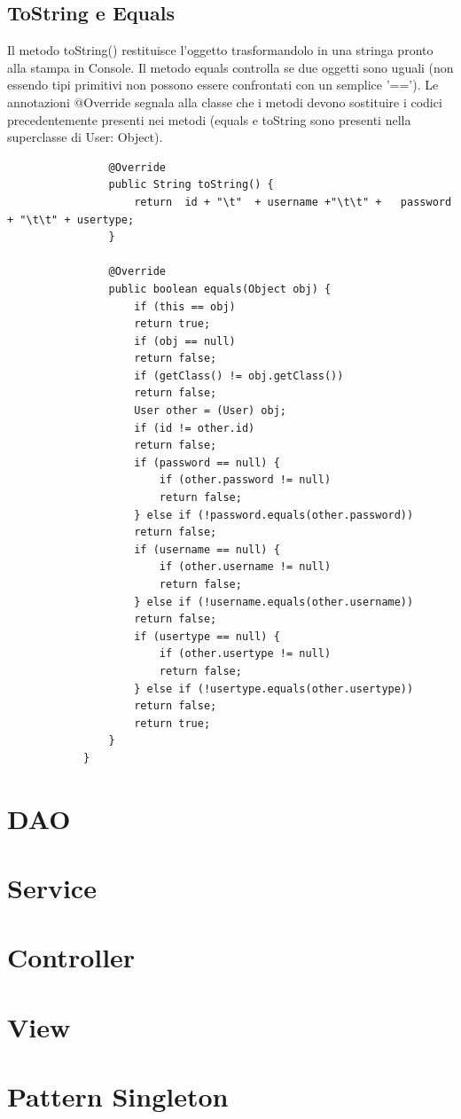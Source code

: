\documentclass[a4paper,12 pt]{article}
\begin{document}
				\subsection{ToString e Equals}
				
				Il metodo toString() restituisce l'oggetto trasformandolo in una stringa pronto alla stampa in Console. Il metodo equals controlla se due oggetti sono uguali (non essendo tipi primitivi non possono essere confrontati con un semplice '=='). Le annotazioni @Override segnala alla classe che i metodi devono sostituire i codici precedentemente presenti nei metodi (equals e toString sono presenti nella superclasse di User: Object).
				\begin{lstlisting}
				@Override
				public String toString() {
					return  id + "\t"  + username +"\t\t" +   password + "\t\t" + usertype;
				}
				
				@Override
				public boolean equals(Object obj) {
					if (this == obj)
					return true;
					if (obj == null)
					return false;
					if (getClass() != obj.getClass())
					return false;
					User other = (User) obj;
					if (id != other.id)
					return false;
					if (password == null) {
						if (other.password != null)
						return false;
					} else if (!password.equals(other.password))
					return false;
					if (username == null) {
						if (other.username != null)
						return false;
					} else if (!username.equals(other.username))
					return false;
					if (usertype == null) {
						if (other.usertype != null)
						return false;
					} else if (!usertype.equals(other.usertype))
					return false;
					return true;
				}
			}
			\end{lstlisting}
	
	
	\section{DAO}
	
	\section{Service}
	
	\section{Controller}
	
	\section{View}
	
	\section{Pattern Singleton}
	
	
\end{document}
